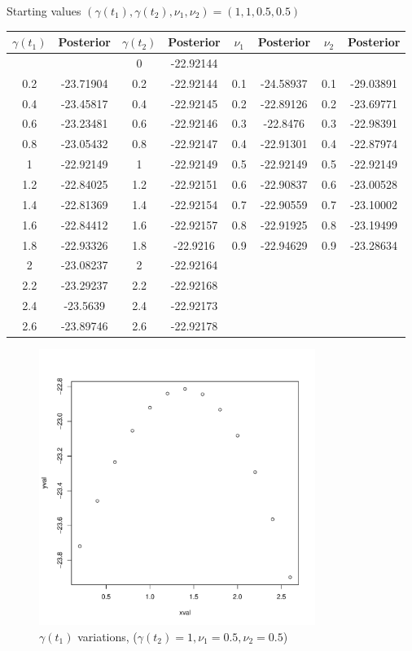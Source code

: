 \documentclass[a4paper,11pt]{article}
\begin{document}
Starting values $(\gamma(t_1), \gamma(t_2), \nu_1, \nu_2) = (1, 1, 0.5, 0.5)$
\begin{table}[H]
\centering
\begin{tabular}{|c|c||c|c||c|c||c|c|}
\hline
$\gamma(t_1)$ & Posterior & $\gamma(t_2)$ & Posterior & $\nu_1$ & Posterior & $\nu_2$ & Posterior \\ \hline
& & 0 & -22.92144 & & & & \\ \hline
0.2 & -23.71904 & 0.2 & -22.92144 & 0.1 & -24.58937 & 0.1 & -29.03891 \\ \hline
0.4 & -23.45817 & 0.4 & -22.92145 & 0.2 & -22.89126 & 0.2 & -23.69771 \\ \hline
0.6 & -23.23481 & 0.6 & -22.92146 & 0.3 & -22.8476 & 0.3 & -22.98391 \\ \hline
0.8 & -23.05432 & 0.8 & -22.92147 & 0.4 & -22.91301 & 0.4 & -22.87974 \\ \hline
1 &  -22.92149  & 1 & -22.92149 & 0.5 & -22.92149 & 0.5 & -22.92149 \\ \hline
1.2 & -22.84025 & 1.2 & -22.92151 & 0.6 & -22.90837 & 0.6 & -23.00528 \\ \hline
1.4 & -22.81369 & 1.4 & -22.92154 & 0.7 & -22.90559 & 0.7 & -23.10002 \\ \hline
1.6 & -22.84412 & 1.6 & -22.92157 & 0.8 & -22.91925 & 0.8 & -23.19499 \\ \hline
1.8 & -22.93326 & 1.8 & -22.9216 & 0.9 & -22.94629 & 0.9 & -23.28634 \\ \hline
2 & -23.08237 & 2 & -22.92164 & & & & \\ \hline
2.2 & -23.29237 & 2.2 & -22.92168 & & & & \\ \hline
2.4 & -23.5639 & 2.4 & -22.92173 & & & & \\ \hline
2.6 & -23.89746 & 2.6 & -22.92178 & & & & \\ \hline
\end{tabular}
\end{table}

\begin{figure}[H]
\centering
\includegraphics[width=0.8\textwidth]{test1_gamma1.pdf}
\caption{$\gamma(t_1)$ variations, ($\gamma(t_2) = 1, \nu_1 = 0.5, \nu_2 = 0.5$)}
\end{figure}
\end{document}
